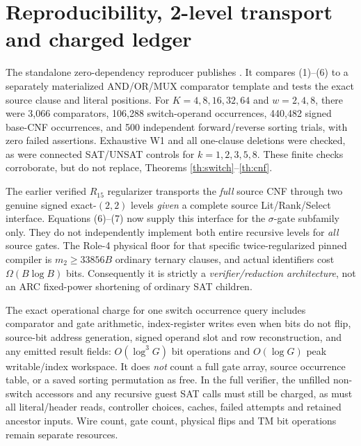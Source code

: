 \documentclass[11pt]{article}
\begin{document}
\section{Reproducibility, 2-level transport and charged ledger}
The standalone zero-dependency reproducer publishes
.
It compares (1)--(6) to a separately materialized
AND/OR/MUX comparator template and tests the exact source
clause and literal positions. For $K=4,8,16,32,64$
and $w=2,4,8$, there were 3,066 comparators,
106,288 switch-operand occurrences,
440,482 signed base-CNF occurrences, and 500 independent
forward/reverse sorting trials, with zero failed assertions.
Exhaustive W1 and all one-clause deletions were checked,
as were connected SAT/UNSAT controls for $k=1,2,3,5,8$.
These finite checks corroborate, but do not replace,
Theorems \ref{th:switch}--\ref{th:cnf}.

The earlier verified $R_{15}$ regularizer transports
the \emph{full} source CNF through two genuine
signed exact-$(2,2)$ levels \emph{given} a complete
source Lit/Rank/Select interface. Equations (6)--(7)
now supply this interface for the $\sigma$-gate
subfamily only. They do not independently implement
both entire recursive levels for \emph{all} source gates.
The Role-4 physical floor for that specific
twice-regularized pinned compiler is
$m_2\ge33856B$ ordinary ternary clauses,
and actual identifiers cost $\Omega(B\log B)$ bits.
Consequently it is strictly a \emph{verifier/reduction
architecture}, not an ARC fixed-power shortening of
ordinary SAT children.

The exact operational charge for one switch occurrence
query includes comparator and gate arithmetic,
index-register writes even when bits do not flip,
source-bit address generation, signed operand slot and
row reconstruction, and any emitted result fields:
$O(\log^3G)$ bit operations and $O(\log G)$ peak
writable/index workspace. It does \emph{not} count
a full gate array, source occurrence table, or a saved
sorting permutation as free. In the full verifier,
the unfilled non-switch accessors and any recursive
guest SAT calls must still be charged, as must all
literal/header reads, controller choices, caches,
failed attempts and retained ancestor inputs.
Wire count, gate count, physical flips and TM bit
operations remain separate resources.
\end{document}
